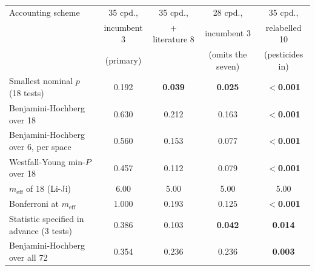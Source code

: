 \begin{tabular}{lcccc}
\hline
Accounting scheme & 35 cpd., & 35 cpd., & 28 cpd., & 35 cpd., \\
                  & incumbent 3 & + literature 8 & incumbent 3 & relabelled 10 \\
                  & (primary) &  & (omits the seven) & (pesticides in) \\
\hline
Smallest nominal $p$ (18 tests)          & 0.192 & \textbf{0.039} & \textbf{0.025} & \textbf{$<$0.001} \\
Benjamini-Hochberg over 18               & 0.630 & 0.212 & 0.163 & \textbf{$<$0.001} \\
Benjamini-Hochberg over 6, per space     & 0.560 & 0.153 & 0.077 & \textbf{$<$0.001} \\
Westfall-Young min-$P$ over 18           & 0.457 & 0.112 & 0.079 & \textbf{$<$0.001} \\
$m_{\mathrm{eff}}$ of 18 (Li-Ji)         & 6.00  & 5.00  & 5.00  & 5.00  \\
Bonferroni at $m_{\mathrm{eff}}$         & 1.000 & 0.193 & 0.125 & \textbf{$<$0.001} \\
Statistic specified in advance (3 tests) & 0.386 & 0.103 & \textbf{0.042} & \textbf{0.014} \\
Benjamini-Hochberg over all 72           & 0.354 & 0.236 & 0.236 & \textbf{0.003} \\
\hline
\end{tabular}
